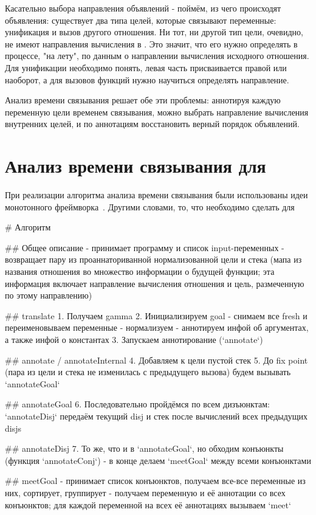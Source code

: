 \documentclass[conference]{IEEEtran}
\begin{document}
Касательно выбора направления объявлений - поймём, из чего происходят объявления: существует два типа целей, которые связывают переменные: унификация и вызов другого отношения. Ни тот, ни другой тип цели, очевидно, не имеют направления вычисления в \miniKanren. Это значит, что его нужно определять в процессе, "на лету", по данным о направлении вычисления исходного отношения. Для унификации необходимо понять, левая часть присваивается правой или наоборот, а для вызовов функций нужно научиться определять направление.

Анализ времени связывания решает обе эти проблемы: аннотируя каждую переменную цели временем связывания, можно выбрать направление вычисления внутренних целей, и по аннотациям восстановить верный порядок объявлений.

\section{Анализ времени связывания для \miniKanren}\label{bta}

При реализации алгоритма анализа времени связывания были использованы идеи монотонного фреймворка~\cite{kam1977monotone}. Другими словами, то, что необходимо сделать для 

\# Алгоритм

\#\# Общее описание
- принимает программу и список input-переменных
- возвращает пару из проаннаториванной нормализованной цели и стека (мапа из названия отношения во множество информации о будущей функции; эта информация включает направление вычисления отношения и цель, размеченную по этому направлению)


\#\# translate
1. Получаем gamma
2. Инициализируем goal
  - снимаем все fresh и переименовываем переменные
  - нормализуем
  - аннотируем инфой об аргументах, а также инфой о константах
3. Запускаем аннотирование (`annotate`)

\#\# annotate / annotateInternal
4. Добавляем к цели пустой стек 
5. До fix point (пара из цели и стека не изменилась с предыдущего вызова) будем вызывать `annotateGoal`

\#\# annotateGoal
6. Последовательно пройдёмся по всем дизъюнктам: `annotateDisj` передаём текущий disj и стек после вычислений всех предыдущих disjs

\#\# annotateDisj
7. То же, что и в `annotateGoal`, но обходим конъюнкты (функция `annotateConj`) - в конце делаем `meetGoal` между всеми конъюнктами

\#\# meetGoal
- принимает список конъюнктов, получаем все-все переменные из них, сортирует, группирует - получаем переменную и её аннотации со всех конъюнктов; для каждой переменной на всех её аннотациях вызываем `meet`
\end{document}

